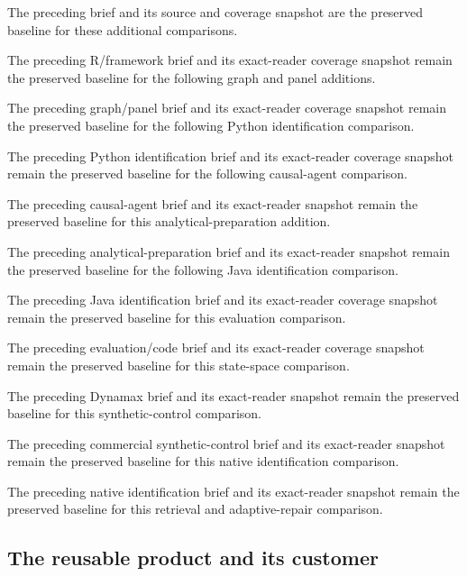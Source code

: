 The preceding brief and its source and coverage snapshot are the
preserved baseline for these additional comparisons.
\citep{sp18_reader,sp18_progress,sp18_census,sp19rs_reader,sp19rs_progress,sp19em_reader,sp19em_progress,sp19oi_reader,sp19oi_progress}

The preceding R/framework brief and its exact-reader coverage snapshot
remain the preserved baseline for the following graph and panel
additions. \citep{sp18f_reader,sp18f_progress}

The preceding graph/panel brief and its exact-reader coverage snapshot
remain the preserved baseline for the following Python identification
comparison. \citep{sp18gp_reader,sp18gp_progress}

The preceding Python identification brief and its exact-reader coverage
snapshot remain the preserved baseline for the following causal-agent
comparison. \citep{sp18pi_reader,sp18pi_progress}

The preceding causal-agent brief and its exact-reader snapshot remain
the preserved baseline for this analytical-preparation addition.
\citep{sp18ar_reader,sp18ar_progress}

The preceding analytical-preparation brief and its exact-reader snapshot
remain the preserved baseline for the following Java identification
comparison. \citep{sp19dd_reader,sp19dd_progress}

The preceding Java identification brief and its exact-reader coverage
snapshot remain the preserved baseline for this evaluation comparison.
\citep{sp19ji_reader,sp19ji_progress}

The preceding evaluation/code brief and its exact-reader coverage
snapshot remain the preserved baseline for this state-space comparison.
\citep{sp19ec_reader,sp19ec_progress}

The preceding Dynamax brief and its exact-reader snapshot remain the
preserved baseline for this synthetic-control comparison.
\citep{sp19dx_reader,sp19dx_progress}

The preceding commercial synthetic-control brief and its exact-reader
snapshot remain the preserved baseline for this native identification
comparison. \citep{sp19sc_reader,sp19sc_progress}

The preceding native identification brief and its exact-reader snapshot
remain the preserved baseline for this retrieval and adaptive-repair
comparison. \citep{sp19ci_reader,sp19ci_progress}

\hypertarget{the-reusable-product-and-its-customer}{%
\subsection{The reusable product and its
customer}\label{the-reusable-product-and-its-customer}}

